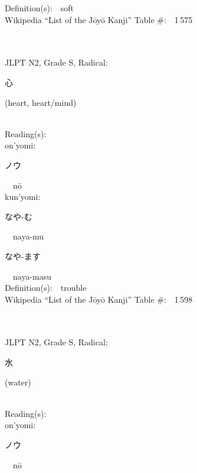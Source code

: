 \begin{multicols}{2}
Definition(s):\ \ soft \\
Wikipedia ``List of the J\=oy\=o Kanji'' Table \#:\ \ 1\,575 \\
\ \ \\
{\fontsize{34pt}{40pt}  }\ \ \\  %
{JLPT N2, Grade S, Radical:\ \ {\begin{CJK}{UTF8}{min} 心 \end{CJK}} (heart, heart/mind) } \\
Reading(s):\ \ \\
{\hspace*{1em}}on'yomi:\ \ \\
{\hspace*{2em}}{\begin{CJK}{UTF8}{min} ノウ \end{CJK}}\ \ n\=o\ \ \\
{\hspace*{1em}}kun'yomi:\ \ \\
{\hspace*{2em}}{\begin{CJK}{UTF8}{min} なや-む \end{CJK}}\ \ naya-mu\ \ \\
{\hspace*{2em}}{\begin{CJK}{UTF8}{min} なや-ます \end{CJK}}\ \ naya-masu\ \ \\
Definition(s):\ \ trouble \\
Wikipedia ``List of the J\=oy\=o Kanji'' Table \#:\ \ 1\,598 \\
\ \ \\
{\fontsize{34pt}{40pt}  }\ \ \\  %
{JLPT N2, Grade S, Radical:\ \ {\begin{CJK}{UTF8}{min} 水 \end{CJK}} (water) } \\
Reading(s):\ \ \\
{\hspace*{1em}}on'yomi:\ \ \\
{\hspace*{2em}}{\begin{CJK}{UTF8}{min} ノウ \end{CJK}}\ \ n\=o\ \ \\

\end{multicols}
